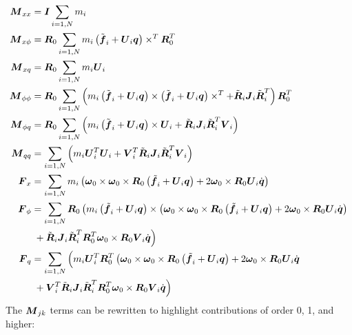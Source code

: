 \begin{align}
	\T{M}_{xx}	&= \T{I} \sum_{i=1,N} m_i \\
	\T{M}_{x\phi}	&= \T{R}_0 \sum_{i=1,N} m_i \plbr{\tilde{\T{f}}_i + \T{U}_i \T{q}}\times^T \T{R}_0^T \\
	\T{M}_{xq}	&= \T{R}_0 \sum_{i=1,N} m_i \T{U}_i \\
	\T{M}_{\phi\phi}&= \T{R}_0 \sum_{i=1,N} \plbr{
		m_i \plbr{\tilde{\T{f}}_i + \T{U}_i \T{q}}\times
		\plbr{\tilde{\T{f}}_i + \T{U}_i \T{q}}\times^T
		+ \tilde{\T{R}}_i \T{J}_i \tilde{\T{R}}_i^T
	} \T{R}_0^T \\
	\T{M}_{\phi q}	&= \T{R}_0 \sum_{i=1,N} \plbr{
		m_i \plbr{\tilde{\T{f}}_i + \T{U}_i \T{q}}\times \T{U}_i
		+ \tilde{\T{R}}_i \T{J}_i \tilde{\T{R}}_i^T \T{V}_i
	} \\
	\T{M}_{qq}	&= \sum_{i=1,N} \plbr{
		m_i \T{U}_i^T \T{U}_i
		+ \T{V}_i^T \tilde{\T{R}}_i \T{J}_i \tilde{\T{R}}_i^T \T{V}_i
	} \\
	\T{F}_x		&= \sum_{i=1,N} m_i \plbr{
		\T{\omega}_0 \times \T{\omega}_0 \times \T{R}_0 \plbr{\tilde{\T{f}_i} + \T{U}_i \T{q}}
		+ 2 \T{\omega}_0 \times \T{R}_0 \T{U}_i \dot{\T{q}} 
	} \\
	\T{F}_{\phi}	&= \sum_{i=1,N} \T{R}_0 \lplbr{
		m_i \plbr{\tilde{\T{f}_i} + \T{U}_i \T{q}}\times \plbr{
			\T{\omega}_0 \times \T{\omega}_0 \times \T{R}_0 \plbr{\tilde{\T{f}_i} + \T{U}_i \T{q}}
			+ 2 \T{\omega}_0 \times \T{R}_0 \T{U}_i \dot{\T{q}}
		}
	} \nonumber \\
			& \rplbr{
		\mbox{} + \tilde{\T{R}}_i \T{J}_i \tilde{\T{R}}_i^T \T{R}_0^T \T{\omega}_0 \times \T{R}_0 \T{V}_i \dot{\T{q}}
	} \\
	\T{F}_q		&= \sum_{i=1,N} \lplbr{
		m_i \T{U}_i^T \T{R}_0^T \lplbr{
			\T{\omega}_0 \times \T{\omega}_0 \times \T{R}_0 \plbr{\tilde{\T{f}_i} + \T{U}_i \T{q}}
			+ 2 \T{\omega}_0 \times \T{R}_0 \T{U}_i \dot{\T{q}}
		}
	} \nonumber \\
			& \rplbr{
		\mbox{} + \T{V}_i^T \tilde{\T{R}}_i \T{J}_i \tilde{\T{R}}_i^T \T{R}_0^T \T{\omega}_0 \times \T{R}_0 \T{V}_i \dot{\T{q}}
	}
\end{align}
The $\T{M}_{jk}$ terms can be rewritten to highlight contributions of order
0, 1, and higher:
